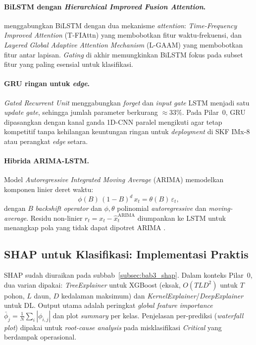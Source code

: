 \paragraph{BiLSTM dengan \emph{Hierarchical Improved Fusion Attention}.}
 menggabungkan BiLSTM dengan dua mekanisme
\emph{attention}: \emph{Time-Frequency Improved Attention} (T-FIAttn)
yang membobotkan fitur waktu-frekuensi, dan \emph{Layered Global
Adaptive Attention Mechanism} (L-GAAM) yang membobotkan fitur antar
lapisan. \emph{Gating} di akhir memungkinkan BiLSTM fokus pada subset
fitur yang paling esensial untuk klasifikasi.

\paragraph{GRU ringan untuk \emph{edge}.}
\emph{Gated Recurrent Unit}  menggabungkan
\emph{forget} dan \emph{input gate} LSTM menjadi satu \emph{update
gate}, sehingga jumlah parameter berkurang $\approx 33\%$. Pada Pilar~0,
GRU dipasangkan dengan kanal ganda 1D-CNN paralel mengikuti
 agar tetap kompetitif tanpa kehilangan
keuntungan ringan untuk \emph{deployment} di SKF IMx-8 atau perangkat
\emph{edge} setara.

\paragraph{Hibrida ARIMA-LSTM.}
Model \emph{Autoregressive Integrated Moving Average} (ARIMA)
 memodelkan komponen linier deret waktu:
\begin{equation*}
  \phi(B)\, (1-B)^d\, x_t = \theta(B)\, \varepsilon_t,
\end{equation*}
dengan $B$ \emph{backshift operator} dan $\phi, \theta$ polinomial
\emph{autoregressive} dan \emph{moving-average}. Residu non-linier
$r_t = x_t - \hat{x}_t^{\text{ARIMA}}$ diumpankan ke LSTM untuk
menangkap pola yang tidak dapat dipotret ARIMA .

\subsection{SHAP untuk Klasifikasi: Implementasi Praktis}
\label{subsec:bab3_kls_shap}

SHAP sudah diuraikan pada subbab~\ref{subsec:bab3_shap}. Dalam konteks
Pilar~0, dua varian dipakai: \emph{TreeExplainer} untuk XGBoost
(eksak, $O(TLD^2)$ untuk $T$ pohon, $L$ daun, $D$ kedalaman maksimum)
dan \emph{KernelExplainer}/\emph{DeepExplainer} untuk DL. Output utama
adalah peringkat \emph{global feature importance}
$\bar{\phi}_j = \tfrac{1}{N}\sum_i |\phi_{i,j}|$ dan plot
\emph{summary} per kelas. Penjelasan per-prediksi (\emph{waterfall plot})
dipakai untuk \emph{root-cause analysis} pada misklasifikasi
\emph{Critical} yang berdampak operasional.

